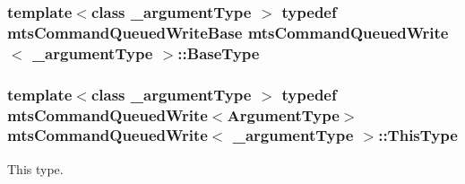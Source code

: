 \hypertarget{classmts_command_queued_write_a45b3d0b46248285d3535ad64ee93a28d}{
\subsubsection[{Base\-Type}]{\setlength{\rightskip}{0pt plus 5cm}template$<$class \-\_\-argument\-Type $>$ typedef {\bf mts\-Command\-Queued\-Write\-Base} {\bf mts\-Command\-Queued\-Write}$<$ \-\_\-argument\-Type $>$\-::{\bf Base\-Type}}}\label{classmts_command_queued_write_a45b3d0b46248285d3535ad64ee93a28d}
\hypertarget{classmts_command_queued_write_aff1e774ee1a65b26df3a2924f8a9bff6}{
\subsubsection[{This\-Type}]{\setlength{\rightskip}{0pt plus 5cm}template$<$class \-\_\-argument\-Type $>$ typedef {\bf mts\-Command\-Queued\-Write}$<${\bf Argument\-Type}$>$ {\bf mts\-Command\-Queued\-Write}$<$ \-\_\-argument\-Type $>$\-::{\bf This\-Type}}}\label{classmts_command_queued_write_aff1e774ee1a65b26df3a2924f8a9bff6}
This type. 

